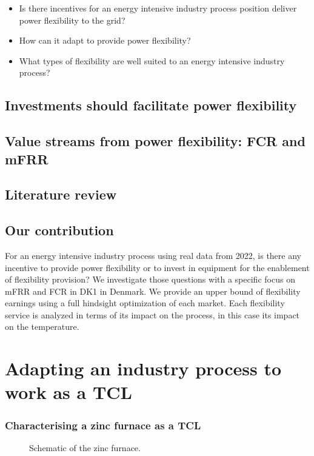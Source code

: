 \documentclass[lettersize,journal]{IEEEtran}
\begin{document}
\begin{itemize}
    \item Is there incentives for an energy intensive industry process position deliver power  flexibility to the grid?
    \item How can it adapt to provide power flexibility?
    \item What types of flexibility are well suited to an energy intensive industry process?
\end{itemize}

\subsection{Investments should facilitate power flexibility}

\subsection{Value streams from power flexibility: FCR and mFRR}

\subsection{Literature review}

\subsection{Our contribution}

For an energy intensive industry process using real data from 2022, is there any incentive to provide power flexibility or to invest in equipment for the enablement of flexibility provision? We investigate those questions with a specific focus on mFRR and FCR in DK1 in Denmark. We provide an upper bound of flexibility earnings using a full hindsight optimization of each market. Each flexibility service is analyzed in terms of its impact on the process, in this case its impact on the temperature.

\section{Adapting an industry process to work as a TCL}

\subsubsection{Characterising a zinc furnace as a TCL}

\begin{figure}[!t]
    \centering
    
    \caption{Schematic of the zinc furnace.}
    \label{fig:furnace_schematic_tikz}
\end{figure}
\end{document}
